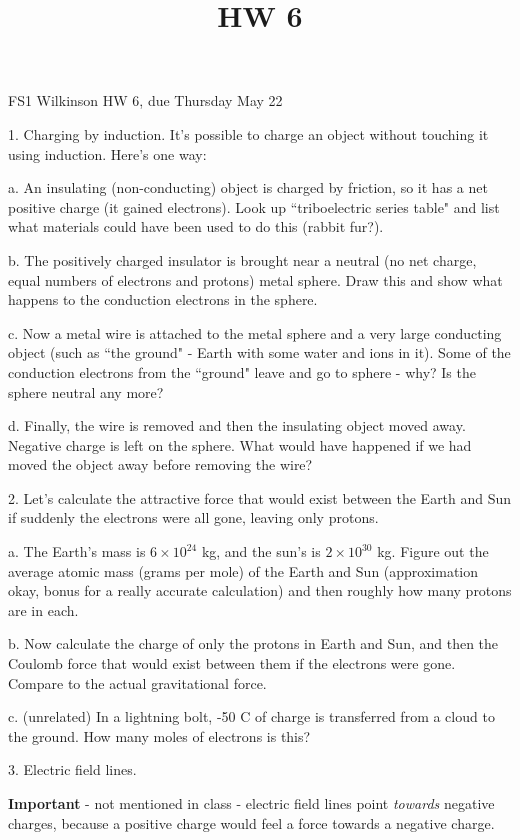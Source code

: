 \documentclass[12pt]{article}
\title{HW 6}
\begin{document}
\setlength{\parindent}{0pt}
\setlength{\parskip}{3mm}

FS1 Wilkinson HW 6, due Thursday May 22

1. Charging by induction. It's possible to charge an object without touching it using induction. Here's one way:

a. An insulating (non-conducting) object is charged by friction, so it has a net positive charge (it gained electrons). Look up ``triboelectric series table" and list what materials could have been used to do this (rabbit fur?).

b. The positively charged insulator is brought near a neutral (no net charge, equal numbers of electrons and protons) metal sphere. Draw this and show what happens to the conduction electrons in the sphere. 

c. Now a metal wire is attached to the metal sphere and a very large conducting object (such as ``the ground" - Earth with some water and ions in it). Some of the conduction electrons from the ``ground" leave and go to sphere - why? Is the sphere neutral any more?

d. Finally, the wire is removed and then the insulating object moved away. Negative charge is left on the sphere. What would have happened if we had moved the object away before removing the wire?


\bigskip
\bigskip

2. Let's calculate the attractive force that would exist between the Earth and Sun if suddenly the electrons were all gone, leaving only protons. 

a. The Earth's mass is $6\times 10^{24}$ kg, and the sun's is $2\times 10^{30}$ kg. Figure out the average atomic mass (grams per mole) of the Earth and Sun (approximation okay, bonus for a really accurate calculation) and then roughly how many protons are in each. 

b. Now calculate the charge of only the protons in Earth and Sun, and then the Coulomb force that would exist between them if the electrons were gone. Compare to the actual gravitational force. 

c. (unrelated) In a lightning bolt, -50 C of charge is transferred from a cloud to the ground. How many moles of electrons is this?

\bigskip
\bigskip

3. Electric field lines.

\textbf{Important }- not mentioned in class - electric field lines point \textit{towards} negative charges, because a positive charge would feel a force towards a negative charge.
\end{document}
